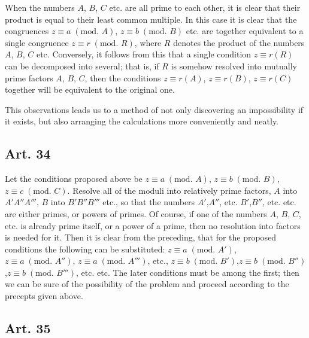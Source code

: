 \documentclass{book}
\theoremstyle{plain}
\theoremstyle{remark}
\begin{document}
When the numbers $A$, $B$, $C$ etc. are all prime to each other, it is clear that their product is equal to their least common multiple.  In this case it is clear that the congruences $z \equiv a\;(\textrm{mod. }A)$, $z \equiv b \;(\textrm{mod. } B)$ etc. are together equivalent to a single congruence $z \equiv r\; (\textrm{mod. }R)$, where $R$ denotes the product of the numbers $A$, $B$, $C$ etc.  Conversely, it follows from this that a single condition $z \equiv r (R)$ can be decomposed into several; that is, if $R$ is somehow resolved into mutually prime factors $A$, $B$, $C$, then the conditions $z\equiv r(A)$, $z \equiv r (B)$, $z \equiv r (C)$ together will be equivalent to the original one.

This observations leads us to a method of not only discovering an impossibility if it exists, but also  arranging the calculations more conveniently and neatly.

\subsection*{Art. 34}

Let the conditions proposed above be $z \equiv a \;(\textrm{mod. }A)$, $z \equiv b \;(\textrm{mod. }B)$, $z \equiv c \;(\textrm{mod. }C)$.   Resolve all of the moduli into relatively prime factors, $A$ into $A'A''A'''$, $B$ into $B'B''B'''$ etc., so that the numbers $A'$,$A''$, etc. $B'$,$B''$, etc. etc. are either primes, or powers of primes.    Of course, if one of the numbers $A$, $B$, $C$, etc. is already prime itself, or a power of a prime, then no resolution into factors is needed for it.   Then it is clear from the preceding, that for the proposed conditions the following can be substituted: $z \equiv a \;(\textrm{mod. }A')$, $z \equiv a \;(\textrm{mod. }A'')$, $z \equiv a \;(\textrm{mod. }A''')$, etc., $z \equiv b \;(\textrm{mod. }B')$,$z \equiv b \;(\textrm{mod. }B'')$,$z \equiv b \;(\textrm{mod. }B''')$, etc. etc.  The later conditions must be among the first; then we can be sure of the possibility of the problem and proceed according to the precepts given above.

\subsection*{Art. 35}
\end{document}
